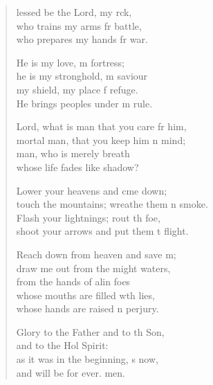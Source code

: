 \begin{verse}
  \begin{patverse}
lessed be the Lord, my rck,\Flex\\
    who trains my arms fr battle,\Med\\
    who prepares my hands fr war.

He is my love, m fortress;\Med\\
    he is my stronghold, m saviour\\
my shield, my place f refuge.\Med\\
    He brings peoples under m rule.

Lord, what is man that you care fr him,\Med\\
    mortal man, that you keep him \pointup{\i}n mind;\\
man, who is merely  breath\Med\\
    whose life fades like  shadow?

Lower your heavens and cme down;\Med\\
    touch the mountains; wreathe them \pointup{\i}n smoke.\\
Flash your lightnings; rout th foe,\Med\\
    shoot your arrows and put them t flight.

Reach down from heaven and save m;\Flex\\
    draw me out from the might waters,\Med\\
    from the hands of alin foes\\
whose mouths are filled w\pointup{\i}th lies,\Med\\
    whose hands are raised \pointup{\i}n perjury.

Glory to the Father and to th Son,\Med\\
    and to the Hol Spirit:\\
as it was in the beginning, \pointup{\i}s now,\Med\\
    and will be for ever. men.
  \end{patverse}
\end{verse}
